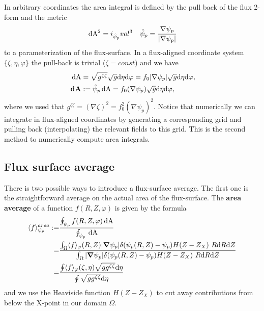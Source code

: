 In arbitrary coordinates the area integral is defined by the pull back
of the flux 2-form and the metric
\begin{align}
\label{}
\,\mathrm{dA}^2 = i_{\hat \psi_p} vol^3 \quad \hat \psi_p = \frac{\nabla \psi_p}{|\nabla \psi_p|}
\end{align}
to a parameterization of the flux-surface.
In a flux-aligned coordinate system $\{\zeta, \eta, \varphi\}$ the pull-back is trivial ($\zeta=const$) and we have
\begin{align}
\,\mathrm{dA} &= \sqrt{g^{\zeta\zeta}} \sqrt{g} \mathrm{d}\eta\mathrm{d}\varphi = f_0|\nabla\psi_p|\sqrt{g}\mathrm{d}\eta\mathrm{d}\varphi,
\\
{\boldsymbol{\,\mathrm{dA}}} &:= \hat\psi_p \,\mathrm{dA} = f_0 (\nabla\psi_p) \sqrt{g}\mathrm{d}\eta\mathrm{d}\varphi,\quad
\label{}
\end{align}
where we used that $g^{\zeta\zeta} = (\nabla\zeta)^2 = f_0^2(\nabla\psi_p)^2$.
Notice that numerically we can integrate in flux-aligned coordinates by generating a corresponding
grid and pulling back (interpolating) the relevant fields to this grid. This is the second method
to numerically compute area integrals.

\subsection{Flux surface average}

There is two possible ways to introduce a flux-surface average.
The first one is the straightforward average on the actual area of the
flux-surface.
The {\bf area average}
of a function $f(R,Z,\varphi)$ is given by the formula
\begin{align}\label{eq:fsa_area}
\langle f \rangle^{area}_{\psi_{p}} :=&
\frac{ \oint_{\psi_p  } f(R,Z,\varphi)\,\mathrm{dA}}{\oint_{\psi_p } \,\mathrm{dA}} \nonumber \\
=& \frac{\int_\Omega \langle f\rangle_\varphi(R,Z) |{\boldsymbol{\nabla}}\psi_p| \delta(\psi_p(R,Z)-\psi_{p})H(Z-Z_X)\ R \mathrm{d} R \mathrm{d} Z}
{\int_\Omega |{\boldsymbol{\nabla}}\psi_p|\delta(\psi_p(R,Z)-\psi_{p})H(Z-Z_X)\ R \mathrm{d} R \mathrm{d} Z} \nonumber\\
=& \frac{\oint \langle f\rangle_\varphi(\zeta,\eta) \sqrt{g g^{\zeta\zeta}}\mathrm{d}\eta}
         { \oint \sqrt{g g^{\zeta\zeta}}\mathrm{d}\eta}
\end{align}
and we use the Heaviside function $H(Z-Z_X)$ to cut away contributions from below the X-point
in our domain $\Omega$.


